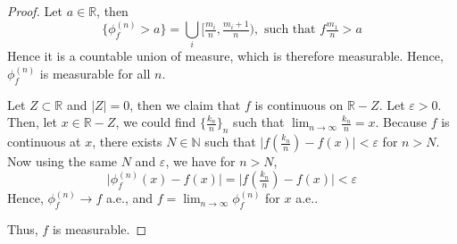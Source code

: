\begin{answer}
    \begin{proof}
        Let $a \in \mathbb{R}$, then
        \begin{equation}
            \{\phi_f^{(n)} > a\} = \bigcup_{i} [\tfrac{m_i}{n},\tfrac{m_i+1}{n}), \text{ such that $f{\tfrac{m_1}{n}} > a$}
        \end{equation}
        Hence it is a countable union of measure, which is therefore measurable. Hence, $\phi_{f}^{(n)}$ is measurable for all $n$.
        
        Let $Z \subset \mathbb{R}$ and $\lvert Z \rvert = 0$, then we claim that $f$ is continuous on $\mathbb{R}-Z$. Let $\varepsilon > 0$. Then, let $x \in \mathbb{R} - Z$, we could find $\{\tfrac{k_n}{n}\}_n$ such that $\lim_{n \to \infty}\tfrac{k_n}{n} = x$. Because $f$ is continuous at $x$, there exists $N \in \mathbb{N}$ such that $\lvert f(\tfrac{k_n}{n}) - f(x) \rvert < \varepsilon$ for $n > N$. Now using the same $N$ and $\varepsilon$, we have for $n > N$,
        \begin{equation}
            \lvert \phi_f^{(n)}(x) - f(x) \rvert = \lvert f(\tfrac{k_n}{n}) - f(x) \rvert < \varepsilon
        \end{equation}
        Hence, $\phi_f^{(n)} \to f$ a.e., and $f = \lim_{n \to \infty}\phi_f^{(n)}$ for $x$ a.e..
        
        Thus, $f$ is measurable.
    \end{proof}
\end{answer}